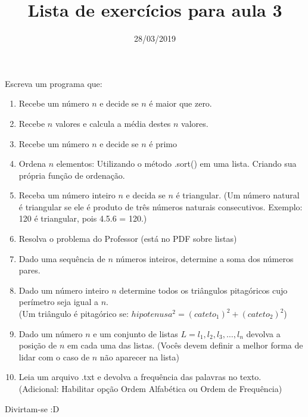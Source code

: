 \documentclass{article}
\title{Lista de exercícios para aula 3}
\date{28/03/2019}
\begin{document}
	\maketitle
	Escreva um programa que:
	\begin{enumerate}
		\item
			Recebe um número $n$ e
			decide se $n$ é maior que zero.
		\item
			Recebe $n$ valores e
			calcula a média destes $n$ valores.
		\item
			Recebe um número $n$ e decide se $n$ é primo
		\item
			Ordena $n$ elementos:
			\subitem
				Utilizando o método .sort() em uma lista.
			\subitem			
				Criando sua própria função de ordenação.
		\item
			Receba um número inteiro $n$ e decida se $n$ é triangular.
			(Um número natural é triangular se ele é produto de três 	
			números naturais consecutivos. Exemplo: 120 é triangular, 
			pois 4.5.6 = 120.)	
		\item
			Resolva o problema do Professor (está no PDF sobre
			listas)
		\item
			Dado uma sequência de $n$ números inteiros, determine 	
			a soma dos números pares. 	
		\item
			Dado um número inteiro $n$ determine todos os triângulos
			pitagóricos cujo perímetro seja igual a $n$.\\
			(Um triângulo é pitagórico se: 
			$hipotenusa^2 = (cateto_1)^2 + (cateto_2)^2$)
		\item
			Dado um número $n$ e um conjunto de listas 
			$L = {l_1, l_2, l_3, \dots, l_n}$ devolva a posição
			de $n$ em cada uma das listas.
			(Vocês devem definir a melhor forma de lidar com o caso
			de $n$ não aparecer na lista)
		\item
			Leia um arquivo .txt e devolva a frequência das palavras
			no texto.\\
			(Adicional: Habilitar opção Ordem Alfabética ou Ordem de
			Frequência)	
	\end{enumerate}
	Divirtam-se :D
\end{document}
